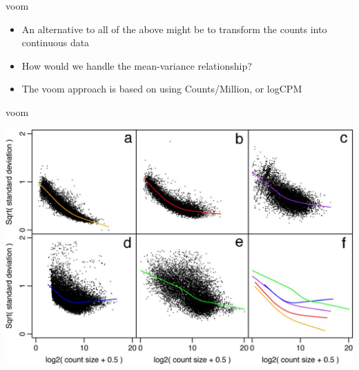 \documentclass[aspectratio=169,11pt]{beamer}
\begin{document}
\begin{frame}{voom}

	\begin{itemize}
		\item An alternative to all of the above might be to transform the counts into continuous data
		\item How would we handle the mean-variance relationship?
		\item The voom approach is based on using Counts/Million, or logCPM
	\end{itemize}

\end{frame}


\begin{frame}{voom}
	
	\begin{center}
	\includegraphics[scale=0.2]{figures/cpm_mean_var.jpg} 
	\end{center}

\end{frame}
\end{document}
